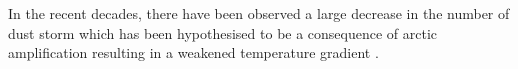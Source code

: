 In the recent decades, there have been observed a large decrease in the number of dust  storm
which has been hypothesised to be a consequence of arctic amplification resulting in a weakened temperature gradient \parencite{liu2020impact}.









